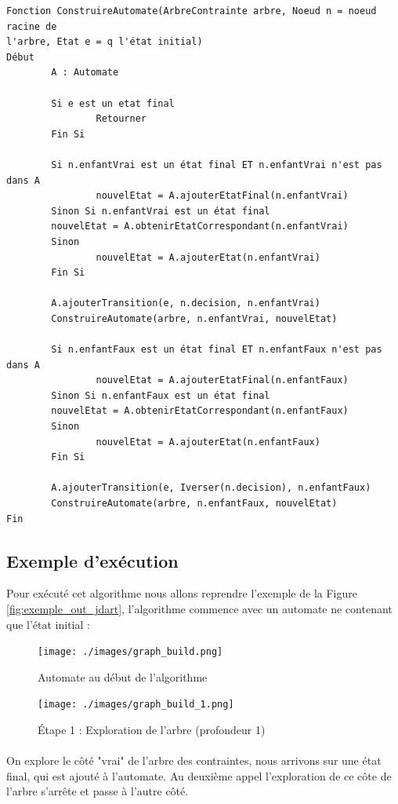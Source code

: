 \begin{verbatim}
Fonction ConstruireAutomate(ArbreContrainte arbre, Noeud n = noeud racine de 
l'arbre, Etat e = q l'état initial)
Début
        A : Automate
	
        Si e est un etat final
                Retourner 
        Fin Si
        
        Si n.enfantVrai est un état final ET n.enfantVrai n'est pas dans A
                nouvelEtat = A.ajouterEtatFinal(n.enfantVrai)
        Sinon Si n.enfantVrai est un état final
		nouvelEtat = A.obtenirEtatCorrespondant(n.enfantVrai)
        Sinon
                nouvelEtat = A.ajouterEtat(n.enfantVrai)
        Fin Si
	
        A.ajouterTransition(e, n.decision, n.enfantVrai)
        ConstruireAutomate(arbre, n.enfantVrai, nouvelEtat)

        Si n.enfantFaux est un état final ET n.enfantFaux n'est pas dans A
                nouvelEtat = A.ajouterEtatFinal(n.enfantFaux)
        Sinon Si n.enfantFaux est un état final
		nouvelEtat = A.obtenirEtatCorrespondant(n.enfantFaux)
        Sinon
                nouvelEtat = A.ajouterEtat(n.enfantFaux)
        Fin Si
	
        A.ajouterTransition(e, Iverser(n.decision), n.enfantFaux)
        ConstruireAutomate(arbre, n.enfantFaux, nouvelEtat)
Fin
\end{verbatim}

\subsection{Exemple d'exécution}

Pour exécuté cet algorithme nous allons reprendre l'exemple de la Figure 
\ref{fig:exemple_out_jdart}, l'algorithme commence avec un automate ne 
contenant que l'état initial :

\begin{figure}[H]
 \centering
 \texttt{[image: ./images/graph\_build.png]}
 \caption{Automate au début de l'algorithme}
\end{figure}

\begin{minipage}{.44\linewidth}
 \centering
 \begin{figure}[H]
  \centering
  \texttt{[image: ./images/graph\_build\_1.png]}
  \caption{Étape 1 : Exploration de l'arbre (profondeur 1)}
 \end{figure}
\end{minipage}
\begin{minipage}{.44\linewidth}
 \paragraph{} On explore le côté "vrai" de l'arbre des contraintes, nous 
arrivons sur une état final, qui est ajouté à l'automate. Au deuxième appel 
l'exploration de ce côte de l'arbre s'arrête et passe à l'autre côté.
\end{minipage}

